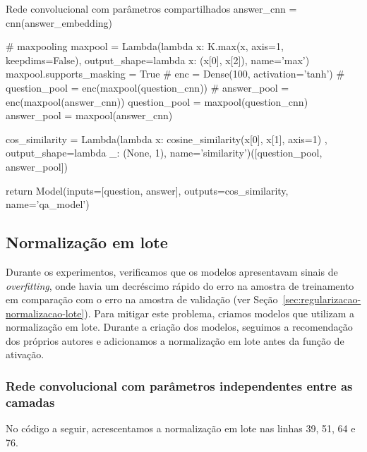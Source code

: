 \begin{mypython-linenumber}{Rede convolucional com parâmetros compartilhados}
            answer_cnn = cnn(answer_embedding)

        # maxpooling
        maxpool = Lambda(lambda x: K.max(x, axis=1, keepdims=False), output_shape=lambda x: (x[0], x[2]),
                         name='max')
        maxpool.supports_masking = True
        # enc = Dense(100, activation='tanh')
        # question_pool = enc(maxpool(question_cnn))
        # answer_pool = enc(maxpool(answer_cnn))
        question_pool = maxpool(question_cnn)
        answer_pool = maxpool(answer_cnn)

        cos_similarity = Lambda(lambda x: cosine_similarity(x[0], x[1], axis=1)
                                       , output_shape=lambda _: (None, 1), name='similarity')([question_pool,
                                                                                               answer_pool])
        

        return Model(inputs=[question, answer], outputs=cos_similarity,
                                   name='qa_model')
\end{mypython-linenumber}

\vspace{2cm}
\subsection{Normalização em lote}

Durante os experimentos, verificamos que os modelos apresentavam sinais de \textit{overfitting}, onde havia um decréscimo rápido do erro na amostra de treinamento em comparação com o erro na amostra de validação (ver Seção~\ref{sec:regularizacao-normalizacao-lote}). Para mitigar este problema, criamos modelos que utilizam a normalização em lote. Durante a criação dos modelos, seguimos a recomendação dos próprios autores \cite{sergey-batch-normalization-2015} e adicionamos a normalização em lote antes da função de ativação.

\subsubsection{Rede convolucional com parâmetros independentes entre as camadas}

No código a seguir, acrescentamos a normalização em lote nas linhas 39, 51, 64 e 76.


